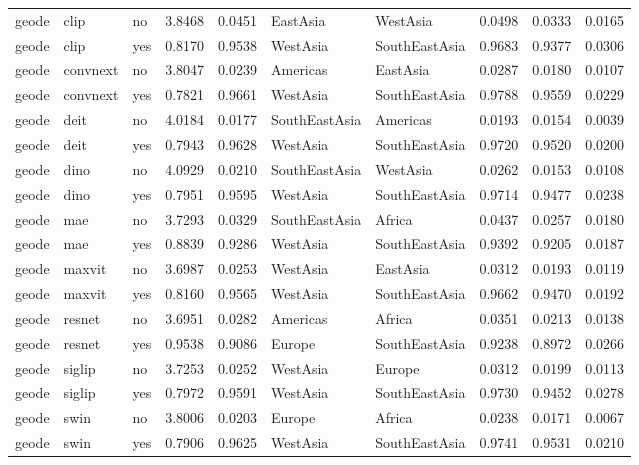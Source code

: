 \begin{table}[ht]
{\begin{tabular}{llllllllll}
geode & clip & no & 3.8468 & 0.0451 & EastAsia & WestAsia & 0.0498 & 0.0333 & 0.0165 \\
geode & clip & yes & 0.8170 & 0.9538 & WestAsia & SouthEastAsia & 0.9683 & 0.9377 & 0.0306 \\
geode & convnext & no & 3.8047 & 0.0239 & Americas & EastAsia & 0.0287 & 0.0180 & 0.0107 \\
geode & convnext & yes & 0.7821 & 0.9661 & WestAsia & SouthEastAsia & 0.9788 & 0.9559 & 0.0229 \\
geode & deit & no & 4.0184 & 0.0177 & SouthEastAsia & Americas & 0.0193 & 0.0154 & 0.0039 \\
geode & deit & yes & 0.7943 & 0.9628 & WestAsia & SouthEastAsia & 0.9720 & 0.9520 & 0.0200 \\
geode & dino & no & 4.0929 & 0.0210 & SouthEastAsia & WestAsia & 0.0262 & 0.0153 & 0.0108 \\
geode & dino & yes & 0.7951 & 0.9595 & WestAsia & SouthEastAsia & 0.9714 & 0.9477 & 0.0238 \\
geode & mae & no & 3.7293 & 0.0329 & SouthEastAsia & Africa & 0.0437 & 0.0257 & 0.0180 \\
geode & mae & yes & 0.8839 & 0.9286 & WestAsia & SouthEastAsia & 0.9392 & 0.9205 & 0.0187 \\
geode & maxvit & no & 3.6987 & 0.0253 & WestAsia & EastAsia & 0.0312 & 0.0193 & 0.0119 \\
geode & maxvit & yes & 0.8160 & 0.9565 & WestAsia & SouthEastAsia & 0.9662 & 0.9470 & 0.0192 \\
geode & resnet & no & 3.6951 & 0.0282 & Americas & Africa & 0.0351 & 0.0213 & 0.0138 \\
geode & resnet & yes & 0.9538 & 0.9086 & Europe & SouthEastAsia & 0.9238 & 0.8972 & 0.0266 \\
geode & siglip & no & 3.7253 & 0.0252 & WestAsia & Europe & 0.0312 & 0.0199 & 0.0113 \\
geode & siglip & yes & 0.7972 & 0.9591 & WestAsia & SouthEastAsia & 0.9730 & 0.9452 & 0.0278 \\
geode & swin & no & 3.8006 & 0.0203 & Europe & Africa & 0.0238 & 0.0171 & 0.0067 \\
geode & swin & yes & 0.7906 & 0.9625 & WestAsia & SouthEastAsia & 0.9741 & 0.9531 & 0.0210 \\
\bottomrule
\end{tabular}
}%
\end{table}
